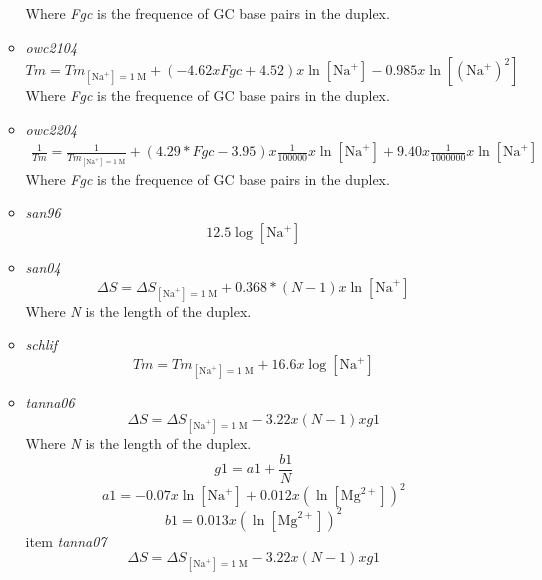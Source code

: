 \documentclass{article}
\begin{document}
\begin{itemize}
\begin{itemize}
 Where \emph{Fgc} is the frequence of GC base pairs in the duplex.
 \item \textit{owc2104}
 \begin{displaymath}
 Tm=Tm_{[\mbox{Na}^+]=1\;\mathrm{M}}+ (-4.62 x Fgc + 4.52) x \ln [\mbox{Na}^+] - 0.985 x \ln [(\mbox{Na}^+)^2]  
 \end{displaymath}
 Where \emph{Fgc} is the frequence of GC base pairs in the duplex.
 \item \textit{owc2204}
 \begin{multline*}
 \frac{1}{Tm}=\frac{1}{Tm_{[\mbox{Na}^+]=1\;\mathrm{M}}}+ (4.29 * Fgc - 3.95) x \frac{1}{100000} x \ln [\mbox{Na}^+] 
  + 9.40 x \frac{1}{1000000} x \ln [\mbox{Na}^+]
 \end{multline*}
 Where \emph{Fgc} is the frequence of GC base pairs in the duplex.
 \item \textit{san96}
 \begin{displaymath}
  12.5  \log [\mbox{Na}^+]   
 \end{displaymath}
 \item \textit{san04}
 \begin{displaymath}
  \Delta{}S=\Delta{}S_{[\mbox{Na}^+]=1\;\mathrm{M}}+ 0.368 * (N - 1) x \ln [\mbox{Na}^+]   
 \end{displaymath}
 Where \emph{N} is the length of the duplex.
 \item \textit{schlif}
 \begin{displaymath}
  Tm=Tm_{[\mbox{Na}^+]=1\;\mathrm{M}}+ 16.6 x \log [\mbox{Na}^+]   
 \end{displaymath}
 \item \textit{tanna06}
 \begin{displaymath}
  \Delta{}S=\Delta{}S_{[\mbox{Na}^+]=1\;\mathrm{M}}- 3.22 x (N - 1) x g1  
 \end{displaymath}
 Where \emph{N} is the length of the duplex.
 \begin{displaymath}
  g1=a1 + \frac{b1}{N}  
 \end{displaymath}
 \begin{displaymath}
  a1= -0.07 x \ln [\mbox{Na}^+] + 0.012 x (\ln [\mbox{Mg}^{2+}])^2  
 \end{displaymath}
 \begin{displaymath}
  b1= 0.013 x (\ln [\mbox{Mg}^{2+}])^2  
 \end{displaymath}
 item \textit{tanna07}
 \begin{displaymath}
  \Delta{}S=\Delta{}S_{[\mbox{Na}^+]=1\;\mathrm{M}}- 3.22 x (N - 1) x g1  
 \end{displaymath}

\end{itemize}
\end{itemize}
\end{document}
